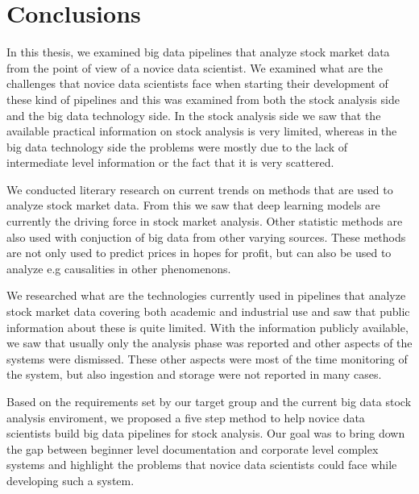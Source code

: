 \chapter{Conclusions}
\label{chapter:conclusions}



In this thesis, we examined big data pipelines that analyze stock market data from the point of view of a novice data scientist.
We examined what are the challenges that novice data scientists face when starting their development of these kind of pipelines and this was examined from both the stock analysis side and the big data technology side.
In the stock analysis side we saw that the available practical information on stock analysis is very limited, whereas in the big data technology side the problems were mostly due to the lack of intermediate level information or the fact that it is very scattered.

We conducted literary research on current trends on methods that are used to analyze stock market data.
From this we saw that deep learning models are currently the driving force in stock market analysis.
Other statistic methods are also used with conjuction of big data from other varying sources.
These methods are not only used to predict prices in hopes for profit, but can also be used to analyze e.g causalities in other phenomenons.

We researched what are the technologies currently used in pipelines that analyze stock market data covering both academic and industrial use and saw that public information about these is quite limited.
With the information publicly available, we saw that usually only the analysis phase was reported and other aspects of the systems were dismissed.
These other aspects were most of the time monitoring of the system, but also ingestion and storage were not reported in many cases.

Based on the requirements set by our target group and the current big data stock analysis enviroment, we proposed a five step method to help novice data scientists build big data pipelines for stock analysis.
Our goal was to bring down the gap between beginner level documentation and corporate level complex systems and highlight the problems that novice data scientists could face while developing such a system.

